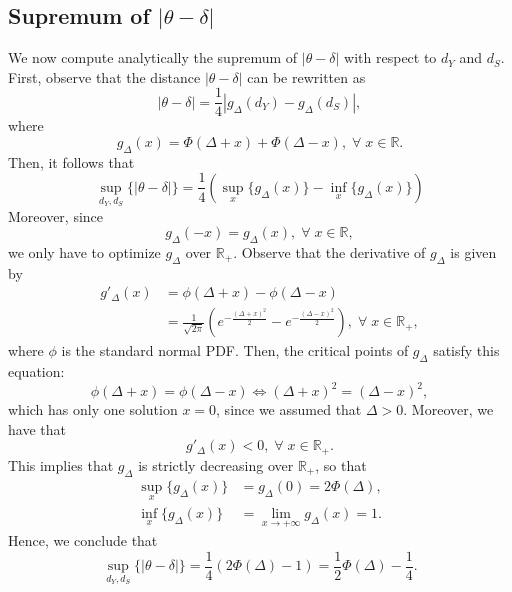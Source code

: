 \documentclass[referee,usenatbib]{biom}
\newcommand{\R}{\mathbb{R}}
\begin{document}
\subsection{Supremum of \texorpdfstring{\(|\theta - \delta|\)}{|theta - delta|}}
\label{app:supremum_delta_binary_covariate}

We now compute analytically the supremum of \(|\theta - \delta|\) with respect to \(d_{Y}\) and \(d_{S}\). First, observe that the distance \(|\theta - \delta|\) can be rewritten as
\begin{equation*}
    |\theta - \delta| = \frac{1}{4} \left| g_{\Delta}(d_{Y}) - g_{\Delta}(d_{S}) \right|,
\end{equation*}
where 
\begin{equation*}
    g_{\Delta}(x) = \Phi(\Delta + x) + \Phi(\Delta - x), \; \forall \; x \in \mathbb{R}.
\end{equation*}
Then, it follows that
\begin{equation*}
    \sup_{d_{Y}, d_{S}} \{ |\theta - \delta| \} = \frac{1}{4} \left( \sup_{x} \{ g_{\Delta}(x) \} - \inf_{x} \{ g_{\Delta}(x) \} \right)
\end{equation*}
Moreover, since 
\begin{equation*}
    g_{\Delta}(-x) = g_{\Delta}(x), \; \forall \; x \in \mathbb{R},
\end{equation*}
we only have to optimize \(g_{\Delta}\) over \(\R_{+}\). Observe that the derivative of \(g_{\Delta}\) is given by
\begin{align*}
    g'_{\Delta}(x) & = \phi(\Delta + x) - \phi(\Delta - x) \\
    & = \frac{1}{\sqrt{2 \pi}} \left( e^{-\frac{(\Delta + x)^2}{2}} - e^{-\frac{(\Delta - x)^2}{2}} \right), \; \forall \; x \in \R_{+},
\end{align*}
where \(\phi\) is the standard normal PDF. Then, the critical points of \(g_{\Delta}\) satisfy this equation:
\begin{equation*}
    \phi(\Delta + x) = \phi(\Delta - x) \iff ( \Delta + x )^2 = ( \Delta - x )^2,
\end{equation*}
which has only one solution \(x = 0\), since we assumed that \(\Delta > 0\). Moreover, we have that
\begin{equation*}
    g'_{\Delta}(x) < 0, \; \forall \; x \in \R_{+}.
\end{equation*}
This implies that \(g_{\Delta}\) is strictly decreasing over \(\R_{+}\), so that
\begin{align*}
    \sup_{x} \{ g_{\Delta}(x) \} & = g_{\Delta}(0) = 2 \Phi(\Delta), \\
    \inf_{x} \{ g_{\Delta}(x) \} & = \lim_{x \to +\infty} g_{\Delta}(x) = 1.
\end{align*}
Hence, we conclude that
\begin{equation*}
    \sup_{d_{Y}, d_{S}} \{ |\theta - \delta| \} = \frac{1}{4} \left( 2 \Phi(\Delta) - 1 \right) = \frac{1}{2} \Phi(\Delta) - \frac{1}{4}.
\end{equation*}
\end{document}
